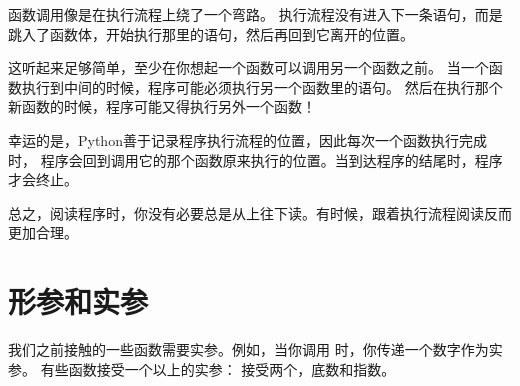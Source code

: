 函数调用像是在执行流程上绕了一个弯路。
执行流程没有进入下一条语句，而是跳入了函数体，开始执行那里的语句，然后再回到它离开的位置。


这听起来足够简单，至少在你想起一个函数可以调用另一个函数之前。
当一个函数执行到中间的时候，程序可能必须执行另一个函数里的语句。
然后在执行那个新函数的时候，程序可能又得执行另外一个函数！


幸运的是，Python善于记录程序执行流程的位置，因此每次一个函数执行完成时，
程序会回到调用它的那个函数原来执行的位置。当到达程序的结尾时，程序才会终止。


总之，阅读程序时，你没有必要总是从上往下读。有时候，跟着执行流程阅读反而更加合理。


%
\section{形参和实参}
\label{parameters}
  
  


我们之前接触的一些函数需要实参。例如，当你调用  时，你传递一个数字作为实参。
有些函数接受一个以上的实参：  接受两个，底数和指数。


